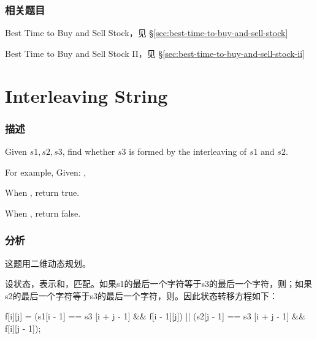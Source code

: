 \subsubsection{相关题目}
\begindot
\item Best Time to Buy and Sell Stock，见 \S \ref{sec:best-time-to-buy-and-sell-stock}
\item Best Time to Buy and Sell Stock II，见 \S \ref{sec:best-time-to-buy-and-sell-stock-ii}
\myenddot


\section{Interleaving String} %
\label{sec:interleaving-string}


\subsubsection{描述}
Given $s1, s2, s3$, find whether $s3$ is formed by the interleaving of $s1$ and $s2$.

For example, Given: ,

When , return true.

When , return false.


\subsubsection{分析}
这题用二维动态规划。

设状态，表示和，匹配。如果s1的最后一个字符等于s3的最后一个字符，则；如果s2的最后一个字符等于s3的最后一个字符，则。因此状态转移方程如下：
\begin{Code}
f[i][j] = (s1[i - 1] == s3 [i + j - 1] && f[i - 1][j])
       || (s2[j - 1] == s3 [i + j - 1] && f[i][j - 1]);
\end{Code}

